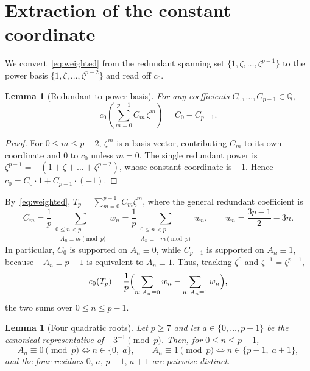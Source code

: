 \documentclass[11pt]{article}
\newtheorem{lemma}[theorem]{Lemma}
\theoremstyle{definition}
\newcommand{\Q}{\mathbb{Q}}
\begin{document}
\section{Extraction of the constant coordinate}\label{sec:extract}

We convert~\eqref{eq:weighted} from the redundant spanning set $\{1,\zeta,\dots,\zeta^{p-1}\}$ to the power basis $\{1,\zeta,\dots,\zeta^{p-2}\}$ and read off $c_0$.

\begin{lemma}[Redundant-to-power basis]\label{lem:redundant}
For any coefficients $C_0,\dots,C_{p-1}\in\Q$,
\[
  c_0\!\left(\sum_{m=0}^{p-1}C_m\,\zeta^{m}\right)=C_0-C_{p-1}.
\]
\end{lemma}

\begin{proof}
For $0\le m\le p-2$, $\zeta^{m}$ is a basis vector, contributing $C_m$ to its own coordinate and $0$ to $c_0$ unless $m=0$. The single redundant power is $\zeta^{p-1}=-(1+\zeta+\dots+\zeta^{p-2})$, whose constant coordinate is $-1$. Hence $c_0=C_0\cdot 1+C_{p-1}\cdot(-1)$.
\end{proof}

By~\eqref{eq:weighted}, $T_p=\sum_{m=0}^{p-1}C_m\zeta^{m}$, where the
general redundant coefficient is
\[
  C_m
  =\frac1p
    \sum_{\substack{0\le n<p\\-A_n\equiv m\pmod p}}w_n
  =\frac1p
    \sum_{\substack{0\le n<p\\A_n\equiv -m\pmod p}}w_n,
  \qquad
  w_n=\frac{3p-1}{2}-3n.
\]
In particular, $C_0$ is supported on $A_n\equiv0$, while $C_{p-1}$ is
supported on $A_n\equiv1$, because
$-A_n\equiv p-1$ is equivalent to $A_n\equiv1$.  Thus, tracking
$\zeta^{0}$ and $\zeta^{-1}=\zeta^{p-1}$,
\[
  c_0(T_p)=\frac1p\Bigl(\sum_{n:\,A_n\equiv 0}w_n-\sum_{n:\,A_n\equiv 1}w_n\Bigr),
\]
the two sums over $0\le n\le p-1$.

\begin{lemma}[Four quadratic roots]\label{lem:roots}
Let $p\ge 7$ and let $a\in\{0,\ldots,p-1\}$ be the canonical representative
of $-3^{-1}\pmod p$. Then, for $0\le n\le p-1$,
\[
  A_n\equiv 0\pmod p\iff n\in\{0,\;a\},\qquad
  A_n\equiv 1\pmod p\iff n\in\{p-1,\;a+1\},
\]
and the four residues $0,\,a,\,p-1,\,a+1$ are pairwise distinct.
\end{lemma}
\end{document}
